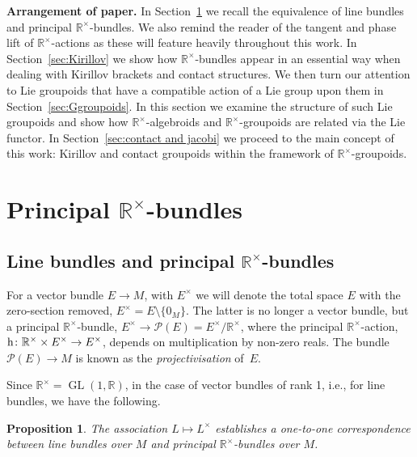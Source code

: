 \documentclass[pdftex]{sigma}
\newcommand{\rmh}{\textnormal{h}}
\DeclareMathOperator{\GL}{GL}
\newcommand{\R}{{\mathbb R}}
\newcommand{\ti}{\times}
\def\cP{\mathcal{P}}
\def\Rt{{\R^\times}}
\numberwithin{equation}{section}
\newtheorem{Proposition}[Theorem]{Proposition}
 { \theoremstyle{definition}
\newtheorem{Definition}[Theorem]{Definition}
\newtheorem{Example}[Theorem]{Example}
\newtheorem{Remark}[Theorem]{Remark} }
\begin{document}
\textbf{Arrangement of paper.} In Section~\ref{sec:PrincipalRbundles} we recall the equivalence of line bundles and principal $\mathbb{R}^{\times}$-bundles. We also remind the reader of the tangent and phase lift of $\mathbb{R}^{\times}$-actions as these will feature heavily throughout this work. In Section~\ref{sec:Kirillov} we show how $\mathbb{R}^{\times}$-bundles appear in an essential way when dealing with Kirillov brackets and contact structures. We then turn our attention to Lie groupoids that have a compatible action of a Lie group upon them in Section~\ref{sec:Ggroupoids}. In this section we examine the structure of such Lie groupoids and show how $\Rt$-algebroids and $\mathbb{R}^{\times}$-groupoids are related via the Lie functor. In Section~\ref{sec:contact and jacobi} we proceed to the main concept of this work: Kirillov and contact groupoids within the framework of $\mathbb{R}^{\times}$-groupoids.

\section[Principal $\R^\times$-bundles]{Principal $\boldsymbol{\R^\times}$-bundles}\label{sec:PrincipalRbundles}

\subsection[Line bundles and principal $\mathbb{R}^{\times}$-bundles]{Line bundles and principal $\boldsymbol{\mathbb{R}^{\times}}$-bundles}\label{subsec:Lines and R^x}

For a vector bundle $E\to M$, with $E^\ti$ we will denote the total space $E$ with the zero-section removed, $E^\ti=E\setminus\{ 0_M\}$. The latter is no longer a vector bundle, but a principal $\R^\ti$-bundle, $E^\ti\to \cP(E)=E^\ti/\R^\ti$, where the principal $\R^\ti$-action, $\rmh\colon \mathbb{R}^{\times} \times E^{\times} \rightarrow E^{\times}$, depends on multiplication by non-zero reals. The bundle $\cP(E) \rightarrow M$ is known as the \emph{projectivisation} of~$E$.

Since $\R^\ti=\GL(1,\R)$, in the case of vector bundles of rank 1, i.e., for line bundles, we have the following.
\begin{Proposition}
The association $L\mapsto L^\ti$ establishes a one-to-one correspondence between line bundles over $M$ and principal $\mathbb{R}^{\times}$-bundles over $M$.
\end{Proposition}
\end{document}
